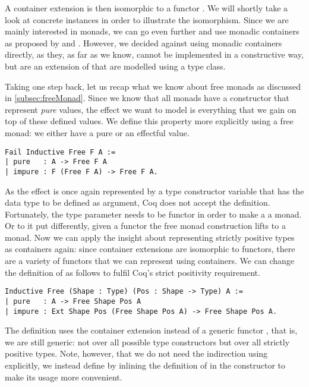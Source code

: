 A container extension  is then isomorphic to a functor .
We will shortly take a look at concrete instances in order to illustrate the isomorphism.
Since we are mainly interested in monads, we can go even further and use monadic containers as proposed by \citet{altenkirch2017monadic} and \citet{uustalu2017partiality}.
However, we decided against using monadic containers directly, as they, as far as we know, cannot be implemented in a constructive way, but are an extension of  that are modelled using a type class.

Taking one step back, let us recap what we know about free monads \citep{swierstra2008data} as discussed in \autoref{subsec:freeMonad}.
Since we know that all monads have a constructor that represent \emph{pure} values, the effect we want to model is
everything that we gain on top of these defined values.
We define this property more explicitly using a free monad: we either have a pure or an effectful value.

\begin{verbatim}
Fail Inductive Free F A :=
| pure   : A -> Free F A
| impure : F (Free F A) -> Free F A.
\end{verbatim}

As the effect is once again represented by a type constructor variable  that has the data type to be defined as argument, Coq does not accept the definition.
Fortunately, the type parameter  needs to be functor in order to make a  a monad.
Or to it put differently, given a functor  the free monad construction lifts  to a monad.
Now we can apply the insight about representing strictly positive types as containers again: since container extensions are isomorphic to functors, there are a variety of functors that we can represent using containers.
We can change the definition of  as follows to fulfil Coq's strict positivity requirement.

\begin{verbatim}
Inductive Free (Shape : Type) (Pos : Shape -> Type) A :=
| pure   : A -> Free Shape Pos A
| impure : Ext Shape Pos (Free Shape Pos A) -> Free Shape Pos A.
\end{verbatim}

The definition uses the container extension instead of a generic functor , that is, we are still generic: not over all possible type constructors but over all strictly positive types.
Note, however, that we do not need the indirection using  explicitly, we instead define  by inlining the definition of  in the constructor  to make its usage more convenient.


